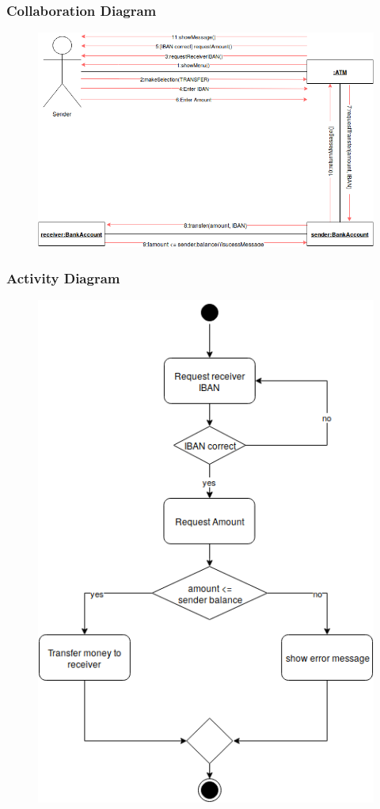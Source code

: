 \documentclass{article}
\begin{document}
		\newpage\subsubsection{Collaboration Diagram}	
		\begin{figure}[h!]
		  \includegraphics[width=\linewidth]{img/transfer_collaboration.png}
		\end{figure}

		\newpage\subsubsection{Activity Diagram}
		\begin{figure}[h!]
			\begin{center}
				\includegraphics[height=\linewidth]{img/transfer_activity.png}
			\end{center}
		\end{figure}
\end{document}
